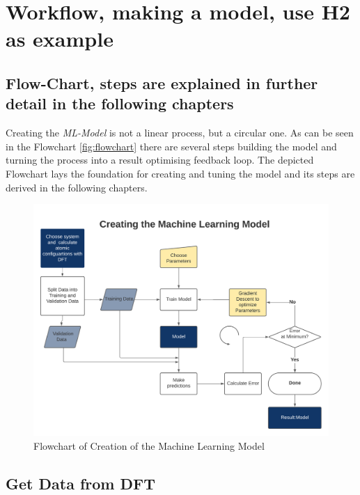 \section{Workflow, making a model, use H2 as example}
\label{section:4.2}

\subsection{Flow-Chart, steps are explained in further detail in the following chapters}
\label{subsection:4.2.1}


Creating the \textit{ML-Model} is not a linear process, but a circular one. As can be seen in the Flowchart \ref{fig:flowchart} there are several steps building the model and turning the process into a result optimising feedback loop. The depicted Flowchart lays the foundation for creating and tuning the model and its steps are derived in the following chapters. 

\begin{figure}
	\includegraphics{../Bilder/Flowchart_ML_Model.png}
	\caption{Flowchart of Creation of the Machine Learning Model}
	\label{flowchart}
\end{figure}

\subsection{Get Data from DFT}
\label{subsection:4.2.2}

